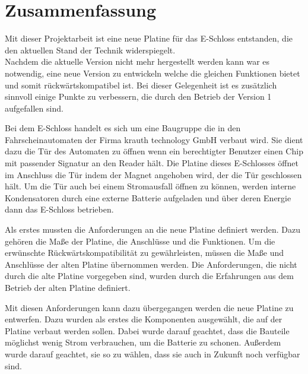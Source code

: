 
\chapter{Zusammenfassung}

Mit dieser Projektarbeit ist eine neue Platine für das E-Schloss entstanden, die den aktuellen Stand der Technik widerspiegelt. \\
Nachdem die aktuelle Version nicht mehr hergestellt werden kann war es notwendig, eine neue Version zu entwickeln welche
die gleichen Funktionen bietet und somit rückwärtskompatibel ist. Bei dieser Gelegenheit ist es zusätzlich sinnvoll einige
Punkte zu verbessern, die durch den Betrieb der Version 1 aufgefallen sind. 

Bei dem E-Schloss handelt es sich um eine Baugruppe die in den Fahrscheinautomaten der Firma krauth technology GmbH verbaut wird.
Sie dient dazu die Tür des Automaten zu öffnen wenn ein berechtigter Benutzer einen Chip mit passender Signatur an den Reader
hält. Die Platine dieses E-Schlosses öffnet im Anschluss die Tür indem der Magnet angehoben wird, der die Tür geschlossen hält. 
Um die Tür auch bei einem Stromausfall öffnen zu können, werden interne Kondensatoren durch eine externe Batterie aufgeladen
und über deren Energie dann das E-Schloss betrieben.

Als erstes mussten die Anforderungen an die neue Platine definiert werden. Dazu gehören die Maße der Platine, die Anschlüsse
und die Funktionen. Um die erwünschte Rückwärtskompatibilität zu gewährleisten, müssen die Maße und Anschlüsse der alten Platine 
übernommen werden. Die Anforderungen, die nicht durch die alte Platine vorgegeben sind, wurden durch die Erfahrungen aus dem
Betrieb der alten Platine definiert. 

Mit diesen Anforderungen kann dazu übergegangen werden die neue Platine zu entwerfen. Dazu wurden als erstes die 
Komponenten ausgewählt, die auf der Platine verbaut werden sollen. Dabei wurde darauf geachtet, dass die Bauteile
möglichst wenig Strom verbrauchen, um die Batterie zu schonen. Außerdem wurde darauf geachtet, sie so zu wählen, dass
sie auch in Zukunft noch verfügbar sind.

\

